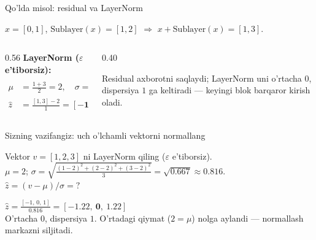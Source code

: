 \documentclass[aspectratio=169,11pt]{beamer}
\begin{document}
\begin{frame}{Qo'lda misol: residual va LayerNorm}
  \begin{tcolorbox}[defbox,title={Residualdan keyingi vektor}]
    \small $x=[0,1]$, $\mathrm{Sublayer}(x)=[1,2]$ $\Rightarrow$
    $x+\mathrm{Sublayer}(x)=[1,3]$.
  \end{tcolorbox}
  \vspace{0.2em}
  \begin{columns}[T]
    \begin{column}{0.56\textwidth}
      \textbf{LayerNorm ($\varepsilon$ e'tiborsiz):}
      \begin{align*}
        \mu &= \tfrac{1+3}{2} = 2, \quad
        \sigma = \sqrt{\tfrac{(1{-}2)^2+(3{-}2)^2}{2}} = 1\\
        \hat{z} &= \tfrac{[1,3]-2}{1} = \mathbf{[-1,\ 1]}
      \end{align*}
    \end{column}
    \begin{column}{0.40\textwidth}
      \begin{tcolorbox}[okbox,top=2pt,bottom=2pt]
        \footnotesize
        Residual axborotni saqlaydi; LayerNorm uni o'rtacha $0$, dispersiya
        $1$ ga keltiradi --- keyingi blok barqaror kirish oladi.
      \end{tcolorbox}
    \end{column}
  \end{columns}
\end{frame}

\begin{frame}{Sizning vazifangiz: uch o'lchamli vektorni normallang}
  \begin{tcolorbox}[warnbox,title=Savol --- 90 soniya]
    \small
    Vektor $v=[1,2,3]$ ni LayerNorm qiling ($\varepsilon$ e'tiborsiz).\\[4pt]
    $\mu=2$; \; $\sigma=\sqrt{\tfrac{(1{-}2)^2+(2{-}2)^2+(3{-}2)^2}{3}}=\sqrt{0.667}\approx 0.816$.\\[3pt]
    \textbf{\large $\hat{z} = (v-\mu)/\sigma = ?$}
  \end{tcolorbox}
  \pause
  \begin{tcolorbox}[okbox,title=Javob]
    \small
    $\hat{z} = \tfrac{[-1,\,0,\,1]}{0.816} = \mathbf{[-1.22,\ 0,\ 1.22]}$\\[3pt]
    \footnotesize O'rtacha $0$, dispersiya $1$. O'rtadagi qiymat ($2=\mu$)
    nolga aylandi --- normallash markazni siljitadi.
  \end{tcolorbox}
\end{frame}
\end{document}
